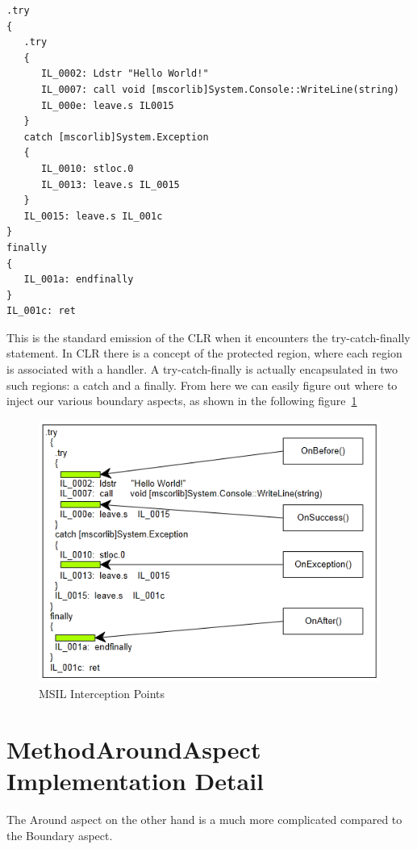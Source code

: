 \begin{lstlisting}[caption={MSIL generated for sample C\# function}, label=methodboundaryB4]
.try
{
   .try
   {
      IL_0002: Ldstr "Hello World!"
      IL_0007: call void [mscorlib]System.Console::WriteLine(string)
      IL_000e: leave.s IL0015
   }
   catch [mscorlib]System.Exception
   {
      IL_0010: stloc.0
      IL_0013: leave.s IL_0015
   }
   IL_0015: leave.s IL_001c
}
finally
{
   IL_001a: endfinally
}
IL_001c: ret
\end{lstlisting}

This is the standard emission of the CLR when it encounters the try-catch-finally statement. In CLR there is a concept of the protected region, where each region is associated with a handler. A try-catch-finally is actually encapsulated in two such regions: a catch and a finally. From here we can easily figure out where to inject our various boundary aspects, as shown in the following figure~\ref{methodboundary02}

\begin{figure}[H]
  \includegraphics[scale=1.0]{MethodBoundaryOverview.PNG}
  \centering
  \caption{MSIL Interception Points\label{methodboundary02}}
\end{figure}

\section{MethodAroundAspect Implementation Detail}

The Around aspect on the other hand is a much more complicated compared to the Boundary aspect.

